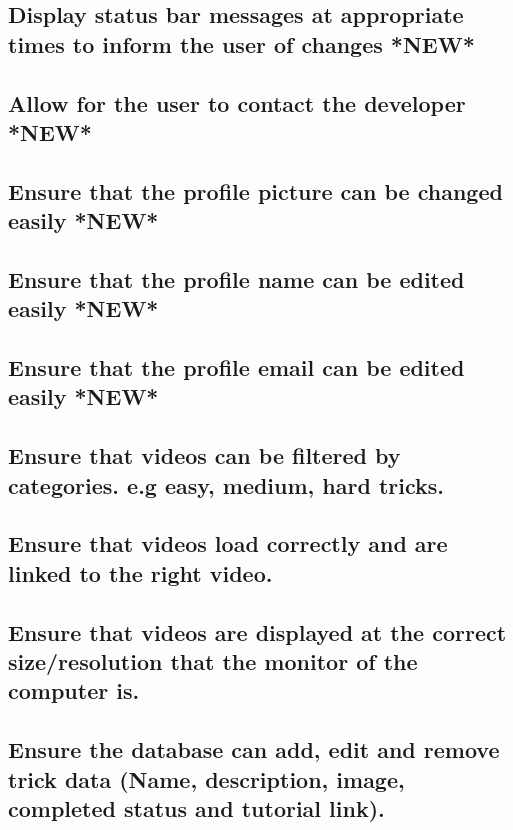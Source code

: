 \subsection {Display status bar messages at appropriate times to inform the user of changes *NEW*}

\subsection {Allow for the user to contact the developer *NEW*}

\subsection {Ensure that the profile picture can be changed easily *NEW*}

\subsection {Ensure that the profile name can be edited easily *NEW*}

\subsection {Ensure that the profile email can be edited easily *NEW*}


\subsection {Ensure that videos can be filtered by categories. e.g easy, medium, hard tricks.}

\subsection {Ensure that videos load correctly and are linked to the right video.}

\subsection {Ensure that videos are displayed at the correct size/resolution that the monitor of the computer is.}



\subsection {Ensure the database can add, edit and remove trick data (Name, description, image, completed status and tutorial link).}

